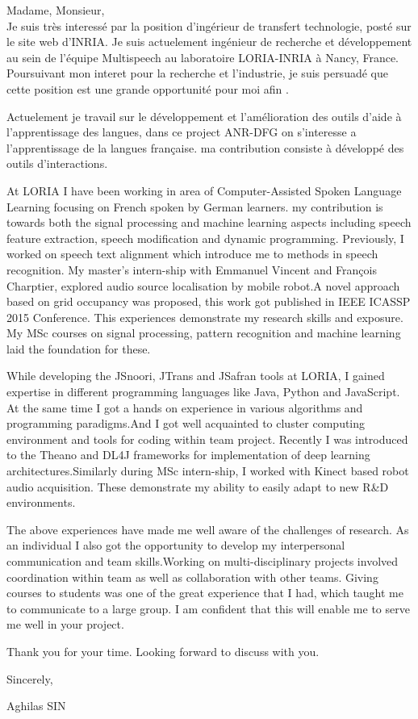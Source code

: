 \documentclass[10pt,a4paper]{letter}
\begin{document}
Madame, Monsieur,\\
		Je suis très interessé par la position d'ingérieur de transfert technologie, posté sur le site web d'INRIA. Je suis actuelement ingénieur de recherche et développement au sein de l'équipe Multispeech au laboratoire LORIA\--INRIA à Nancy, France.  Poursuivant mon interet pour la recherche et l'industrie,  je suis persuadé que cette position est une grande  opportunité pour moi afin .	    
		
		Actuelement je travail sur le développement et l'amélioration des outils d'aide à l'apprentissage des langues, dans ce project ANR-DFG on s'interesse a l'apprentissage de la langues française. ma contribution consiste à développé des outils d'interactions.
		
		At LORIA I have been working in area of Computer-Assisted Spoken Language Learning focusing on French spoken by German learners. my contribution is towards both the signal processing and machine learning aspects including speech feature extraction, speech modification and dynamic programming. Previously, I worked on speech text alignment which introduce me to methods in speech recognition. My master's intern-ship with Emmanuel Vincent and François Charptier, explored audio source localisation by mobile robot.A novel approach based on grid occupancy was proposed, this work got published in IEEE ICASSP 2015 Conference.  This experiences demonstrate my research skills and exposure. My MSc courses on signal processing, pattern recognition and machine learning laid the foundation for these.   

		
		While developing the JSnoori, JTrans and JSafran tools at LORIA, I gained expertise in different programming languages like Java, Python and JavaScript. At the same time I got a hands on experience in various algorithms and programming paradigms.And I got well acquainted 	to cluster computing environment	and tools for coding within team project. Recently I was introduced to the Theano and DL4J frameworks for implementation of deep learning architectures.Similarly during MSc intern-ship, I worked with Kinect based robot audio acquisition. These demonstrate my ability to easily adapt to new R\&D environments.    
		
		The above experiences have made me well aware of the challenges of research. As an individual I also got the opportunity to develop my interpersonal communication and team 		
skills.Working on multi-disciplinary projects involved coordination within  team as well as collaboration with other teams. Giving courses to students was one of the great experience that I had, which taught me to communicate to a large group. I am confident that this will enable me to serve me well in your project.

	Thank you for your time. Looking forward to discuss with you.
	
Sincerely,

Aghilas SIN 
	
		
\end{document}

